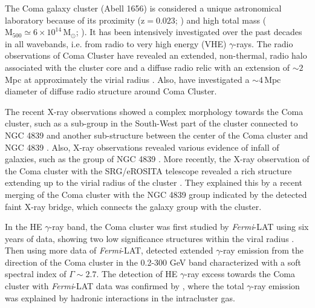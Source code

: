 \documentclass[fleqn,usenatbib]{mnras}
\begin{document}
The Coma galaxy cluster (Abell 1656) is considered a unique astronomical laboratory because of its proximity ($\mathrm{z=0.023}$; \citealt{redshift1991ApJS...77..363S}) and high total mass ($\mathrm{M_{500}\simeq6\times10^{14}\,M_\odot}$; \citealt{2013A&A...554A.140P}). It has been intensively investigated over the past decades in all wavebands, i.e. from radio to very high energy (VHE) $\gamma$-rays. The radio observations of Coma Cluster have revealed an extended, non-thermal, radio halo associated with the cluster core  \citep{radiohalo1959Natur.183.1663L, radio1970MNRAS.151....1W, Radio1993ApJ...406..399G, radio2003A&A...397...53T, 2011MNRAS.412....2B, radiohalo2019SSRv..215...16V} and a diffuse radio relic with an extension of $\sim2$ Mpc at approximately the virial radius \citep{radiorelic1979ApJ...233..453J,relicradio1997A&A...321...55D,2011MNRAS.412....2B}.
Also, \citet{sizecloudradio2007ApJ...659..267K} have investigated a $\mathrm{\sim4\, Mpc}$ diameter of diffuse radio structure around Coma Cluster.

The recent X-ray observations showed a complex morphology towards the Coma cluster, such as a sub-group in the South-West part of the cluster connected to NGC 4839 and another sub-structure between the center of the Coma cluster and NGC 4839 \citep{2003A&A...400..811N}. Also, X-ray observations revealed various evidence of infall of galaxies, such as the group of NGC 4839 \citep[e.g.][]{2001A&A...365L..74N, 2020A&A...634A..30M}. More recently, the X-ray observation of the Coma cluster with the SRG/eROSITA telescope revealed a rich structure extending up to the virial radius of the cluster \citep{2021A&A...651A..41C}. They explained this by a recent merging of the  Coma cluster with the NGC 4839 group indicated by the detected faint X-ray bridge, which connects the galaxy group with the cluster.

In the HE $\gamma$-ray band, the Coma cluster was first studied by \textit{Fermi}-LAT using six years of data, showing two low significance structures within the viral radius \citep{comaFermiCollab2016ApJ...819..149A}. Then using more data of \textit{Fermi}-LAT,  \citet{fermicoma2018PhRvD..98f3006X} detected extended $\gamma$-ray emission from the direction of the Coma cluster in the 0.2-300 GeV band characterized with a soft spectral index of $\Gamma\sim2.7$. The detection of HE $\gamma$-ray excess towards the Coma cluster with \textit{Fermi}-LAT data was confirmed by \citet{2021A&A...648A..60A}, where the total $\gamma$-ray emission was explained by hadronic interactions in the intracluster gas.
\end{document}
